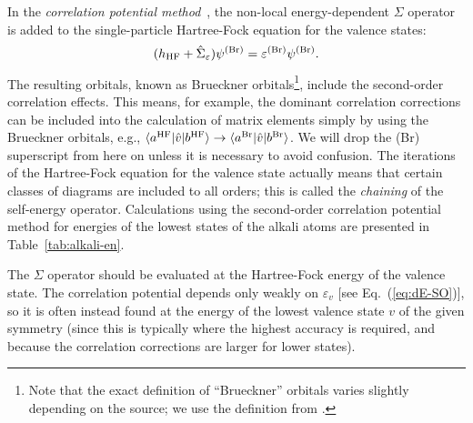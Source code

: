 \documentclass[10pt,twocolumn,a4paper]{article}%
\newcommand{\bra}[1]{\ensuremath{\langle #1|}}	%
\newcommand{\ket}[1]{\ensuremath{|#1\rangle}}	%
\newcommand{\be}{\begin{equation}}
\newcommand{\ee}{\end{equation}}
\def\en{\ensuremath{\varepsilon}}
\begin{document}
In the {\em correlation potential method}~\cite{DzubaPNC1984,DzubaPNC1985}, the non-local energy-dependent $\Sigma$ operator is added to the single-particle Hartree-Fock equation for the valence states:
\be\label{eq:H-Bru}
(h_{\rm HF} + \hat \Sigma_\en)\psi^{\rm (Br)} = \en^{\rm (Br)}\psi^{\rm (Br)}.
\ee
The resulting orbitals, known as Brueckner orbitals\footnote{Note that the exact definition of ``Brueckner'' orbitals varies slightly depending on the source; we use the definition from \cite{DzubaPNC1984}.}, include the second-order correlation effects.
This means, for example, the dominant correlation corrections can be included into the calculation of matrix elements simply by using the Brueckner orbitals, e.g., $\bra{a^{\rm HF}}{\hat v}\ket{b^{\rm HF}}\to\bra{a^{\rm Br}}{\hat v}\ket{b^{\rm Br}}$.
We will drop the (Br) superscript from here on unless it is necessary to avoid confusion.
The iterations of the Hartree-Fock equation for the valence state actually means that certain classes of diagrams are included to all orders; this is called the {\em chaining} of the self-energy operator.
Calculations using the second-order correlation potential method for energies of the lowest states of the alkali atoms are presented in Table~\ref{tab:alkali-en}.



The $\Sigma$ operator should be evaluated at the Hartree-Fock energy of the valence state.
The correlation potential depends only weakly on $\en_v$ [see Eq.~(\ref{eq:dE-SO})],
so it is often instead found at the energy of the lowest valence state $v$ of the given symmetry (since this is typically where the highest accuracy is required, and because the correlation corrections are larger for lower states).



\end{document}
